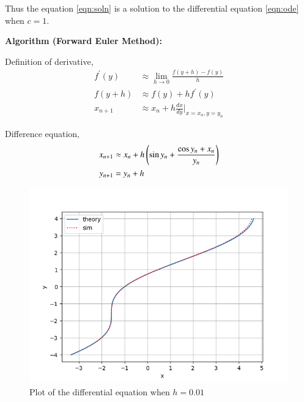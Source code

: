 \documentclass[journal]{IEEEtran}
\begin{document}
Thus the equation \eqref{eqn:soln} is a solution to the differential equation \eqref{eqn:ode} when $c = 1$.

\medskip

\textbf{Algorithm (Forward Euler Method):}

Definition of derivative,
\begin{align}
    f^\prime(y) &\approx \lim_{h\to0}\frac{f(y+h)-f(y)}{h} \\
    f(y+h) &\approx f(y)+hf^\prime(y) \\
    x_{n+1} &\approx x_{n} + h\frac{dx}{dy}\Big|_{x=x_{n}, y=y_{n}}
\end{align}

Difference equation,
\begin{align}
    x_{n+1} &\approx x_{n} + h\left(\sin{y_{n} + \frac{\cos{y_{n}} + x_{n}}{y_{n}}}\right) \\
    y_{n+1} &= y_{n}+h
\end{align}

\begin{figure}[h]
    \centering
    \includegraphics[width=\columnwidth]{figs/plot.png}
    \caption{Plot of the differential equation when $h=0.01$}
    \label{fig:Plot1}
    \end{figure}
\end{document}
